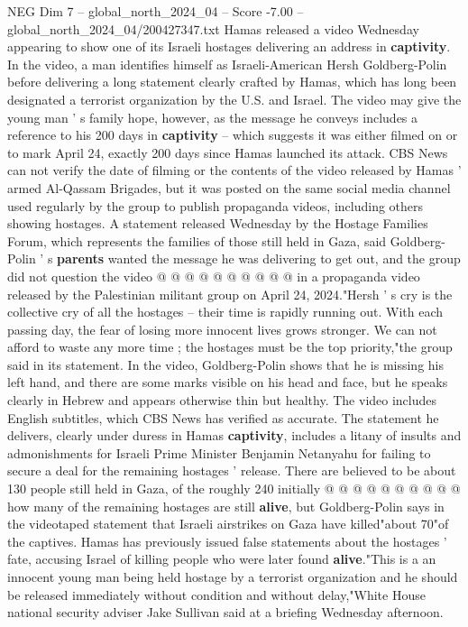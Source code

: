 \begin{textsample}{NEG Dim 7 – global\_north\_2024\_04 – Score -7.00 – global\_north\_2024\_04/200427347.txt}  \label{ex:f7_neg_230}
Hamas released a video Wednesday appearing to show one of its Israeli hostages delivering an address in \textbf{captivity}.
In the video, a man identifies himself as Israeli-American Hersh Goldberg-Polin before delivering a long statement clearly crafted by Hamas, which has long been designated a terrorist organization by the U.S. and Israel.
The video may give the young man ' s family hope, however, as the message he conveys includes a reference to his 200 days in \textbf{captivity} -- which suggests it was either filmed on or to mark April 24, exactly 200 days since Hamas launched its attack.
CBS News can not verify the date of filming or the contents of the video released by Hamas ' armed Al-Qassam Brigades, but it was posted on the same social media channel used regularly by the group to publish propaganda videos, including others showing hostages.
A statement released Wednesday by the Hostage Families Forum, which represents the families of those still held in Gaza, said Goldberg-Polin ' s \textbf{parents} wanted the message he was delivering to get out, and the group did not question the video @ @ @ @ @ @ @ @ @ @ in a propaganda video released by the Palestinian militant group on April 24, 2024."Hersh ' s cry is the collective cry of all the hostages -- their time is rapidly running out.
With each passing day, the fear of losing more innocent lives grows stronger.
We can not afford to waste any more time ; the hostages must be the top priority,"the group said in its statement.
In the video, Goldberg-Polin shows that he is missing his left hand, and there are some marks visible on his head and face, but he speaks clearly in Hebrew and appears otherwise thin but healthy.
The video includes English subtitles, which CBS News has verified as accurate.
The statement he delivers, clearly under duress in Hamas \textbf{captivity}, includes a litany of insults and admonishments for Israeli Prime Minister Benjamin Netanyahu for failing to secure a deal for the remaining hostages ' release.
There are believed to be about 130 people still held in Gaza, of the roughly 240 initially @ @ @ @ @ @ @ @ @ @ how many of the remaining hostages are still \textbf{alive}, but Goldberg-Polin says in the videotaped statement that Israeli airstrikes on Gaza have killed"about 70"of the captives.
Hamas has previously issued false statements about the hostages ' fate, accusing Israel of killing people who were later found \textbf{alive}."This is a an innocent young man being held hostage by a terrorist organization and he should be released immediately without condition and without delay,"White House national security adviser Jake Sullivan said at a briefing Wednesday afternoon.

\end{textsample}
